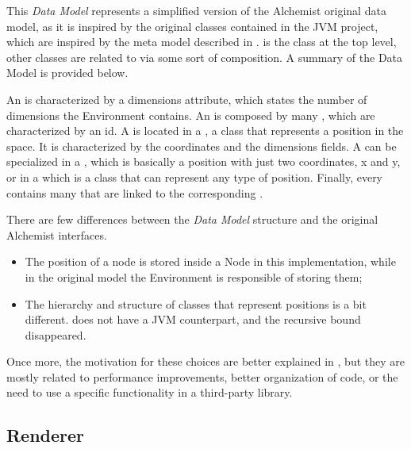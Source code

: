 This \textit{Data Model} represents a simplified version of the Alchemist original data model, as it is inspired by the original classes contained in the JVM project, which are inspired by the meta model described in .  is the class at the top level, other classes are related to  via some sort of composition. A summary of the Data Model is provided below.\newline

An  is characterized by a dimensions attribute, which states the number of dimensions the Environment contains. An  is composed by many , which are characterized by an id. A  is located in a , a class that represents a position in the space. It is characterized by the coordinates and the dimensions fields. A  can be specialized in a , which is basically a position with just two coordinates, x and y, or in a  which is a class that can represent any type of position.
Finally, every  contains many  that are linked to the corresponding .\newline

There are few differences between the \textit{Data Model }structure and the original Alchemist interfaces.
\begin{itemize}
	\item The position of a node is stored inside a Node in this implementation, while in the original model the Environment is responsible of storing them;
	\item The hierarchy and structure of classes that represent positions is a bit different.  does not have a JVM counterpart, and the recursive bound disappeared.
\end{itemize}
Once more, the motivation for these choices are better explained in , but they are mostly related to performance improvements, better organization of code, or the need to use a specific functionality in a third-party library.
\subsection{Renderer}
\label{ssec:renderer}

